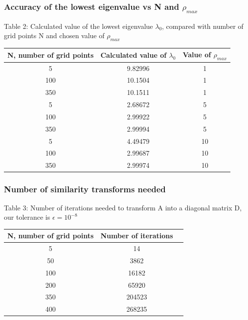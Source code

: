 \documentclass[norsk,a4paper,12pt]{article}
\begin{document}
\subsubsection{Accuracy of the lowest eigenvalue vs N and $\rho_{max}$}\par
\vspace{3mm}

Table 2: Calculated value of the lowest eigenvalue $\lambda_0$, compared with number of grid points N and chosen value of $\rho_{max}$
\par
\vspace{2mm}

\begin{tabular}{|c|c|c|}\hline
     {\bf N, number of grid points} & {\bf Calculated value of $\lambda_0$ } & {\bf Value of $\rho_{max}$} \\ \hline
     5 & 9.82996 & 1\\
     100 & 10.1504 & 1\\
     350 & 10.1511 & 1\\ \hline
     5 & 2.68672 & 5\\
     100 & 2.99922 & 5\\
     350 & 2.99994 & 5\\ \hline
     5 &  4.49479 & 10\\
     100 & 2.99687  & 10\\
     350 & 2.99974 & 10 \\ \hline
  
\end{tabular}\par
\par
\vspace{3mm}

\subsubsection{Number of similarity transforms needed}
\par
\vspace{2mm}

Table 3: Number of iterations needed to transform A into a diagonal matrix D, our tolerance is $\epsilon = 10^{-8}$
\par
\vspace{3mm}
\begin{tabular}{|c|c|c|}\hline
     {\bf N, number of grid points} & {\bf Number of iterations}\\ \hline
     5 & 14\\
     50 & 3862\\
     100 & 16182\\
     200 & 65920\\
     350 & 204523 \\ 
     400 & 268235\\\hline
\end{tabular}\par
  
\end{document}
